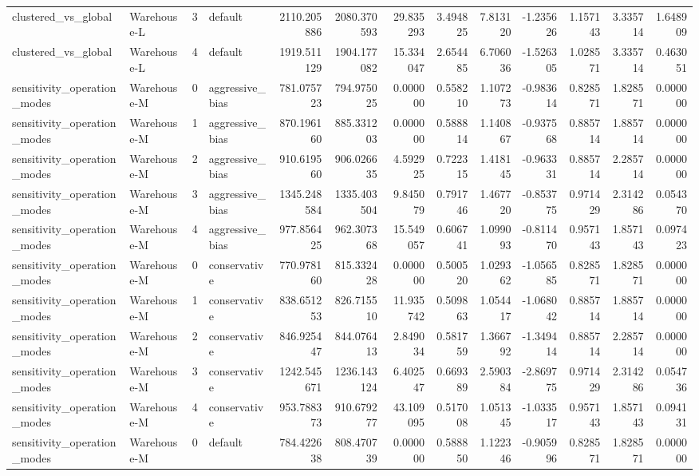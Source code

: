 \begin{tabular}{llrlrrrrrrrrr}
clustered\_vs\_global & Warehouse-L & 3 & default & 2110.205886 & 2080.370593 & 29.835293 & 3.494825 & 7.813120 & -1.235626 & 1.157143 & 3.335714 & 1.648909 \\
clustered\_vs\_global & Warehouse-L & 4 & default & 1919.511129 & 1904.177082 & 15.334047 & 2.654485 & 6.706036 & -1.526305 & 1.028571 & 3.335714 & 0.463051 \\
sensitivity\_operation\_modes & Warehouse-M & 0 & aggressive\_bias & 781.075723 & 794.975025 & 0.000000 & 0.558210 & 1.107273 & -0.983614 & 0.828571 & 1.828571 & 0.000000 \\
sensitivity\_operation\_modes & Warehouse-M & 1 & aggressive\_bias & 870.196160 & 885.331203 & 0.000000 & 0.588814 & 1.140867 & -0.937568 & 0.885714 & 1.885714 & 0.000000 \\
sensitivity\_operation\_modes & Warehouse-M & 2 & aggressive\_bias & 910.619560 & 906.026635 & 4.592925 & 0.722315 & 1.418145 & -0.963331 & 0.885714 & 2.285714 & 0.000000 \\
sensitivity\_operation\_modes & Warehouse-M & 3 & aggressive\_bias & 1345.248584 & 1335.403504 & 9.845079 & 0.791746 & 1.467720 & -0.853775 & 0.971429 & 2.314286 & 0.054370 \\
sensitivity\_operation\_modes & Warehouse-M & 4 & aggressive\_bias & 977.856425 & 962.307368 & 15.549057 & 0.606741 & 1.099093 & -0.811470 & 0.957143 & 1.857143 & 0.097423 \\
sensitivity\_operation\_modes & Warehouse-M & 0 & conservative & 770.978160 & 815.332428 & 0.000000 & 0.500520 & 1.029362 & -1.056585 & 0.828571 & 1.828571 & 0.000000 \\
sensitivity\_operation\_modes & Warehouse-M & 1 & conservative & 838.651253 & 826.715510 & 11.935742 & 0.509863 & 1.054417 & -1.068042 & 0.885714 & 1.885714 & 0.000000 \\
sensitivity\_operation\_modes & Warehouse-M & 2 & conservative & 846.925447 & 844.076413 & 2.849034 & 0.581759 & 1.366792 & -1.349414 & 0.885714 & 2.285714 & 0.000000 \\
sensitivity\_operation\_modes & Warehouse-M & 3 & conservative & 1242.545671 & 1236.143124 & 6.402547 & 0.669389 & 2.590384 & -2.869775 & 0.971429 & 2.314286 & 0.054736 \\
sensitivity\_operation\_modes & Warehouse-M & 4 & conservative & 953.788373 & 910.679277 & 43.109095 & 0.517008 & 1.051345 & -1.033517 & 0.957143 & 1.857143 & 0.094131 \\
sensitivity\_operation\_modes & Warehouse-M & 0 & default & 784.422638 & 808.470739 & 0.000000 & 0.588850 & 1.122346 & -0.905996 & 0.828571 & 1.828571 & 0.000000 \\

\end{tabular}

